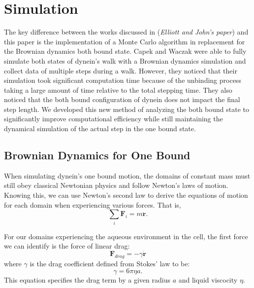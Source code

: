 \section{Simulation}

The key difference between the works discussed in \cite{Capek2017, } (\textit{Elliott and John's paper}) and this paper is the implementation of a Monte Carlo algorithm in replacement for the Brownian dynamics both bound state. Capek and Waczak were able to fully simulate both states of dynein's walk with a Brownian dynamics simulation and collect data of multiple steps during a walk. However, they noticed that their simulation took significant computation time because of the unbinding process taking a large amount of time relative to the total stepping time. They also noticed that the both bound configuration of dynein does not impact the final step length. We developed this new method of analyzing the both bound state to significantly improve computational efficiency while still maintaining the dynamical simulation of the actual step in the one bound state. 



\subsection{Brownian Dynamics for One Bound}
\label{sec:BrownianDynamics}

When simulating dynein's one bound motion, the domains of constant mass must still obey classical Newtonian physics and follow Newton's laws of motion. Knowing this, we can use Newton's second law to derive the equations of motion for each domain when experiencing various forces. That is,
\begin{equation}
	\sum_{i}\textbf{F}_i=m\ddot{\textbf{r}}.
\end{equation} 

For our domains experiencing the aqueous environment in the cell, the first force we can identify is the force of linear drag:
\begin{equation}
	\textbf{F}_{drag}=-\gamma \dot{\textbf{r}}
\end{equation}
where $\gamma$ is the drag coefficient defined from Stokes' law to be:
\begin{equation}
	\gamma=6\pi\eta a.
\end{equation}
This equation specifies the drag term by a given radius $a$ and liquid viscocity $\eta$. 

